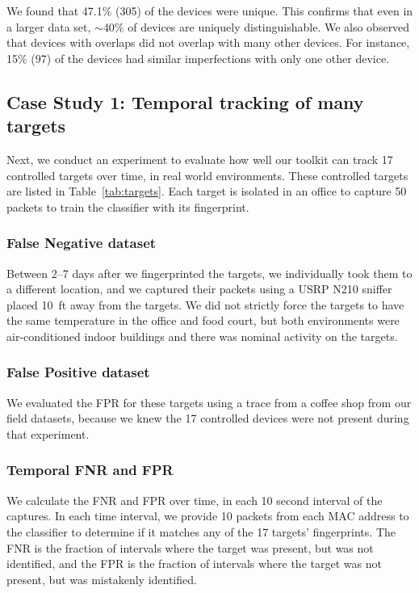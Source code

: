 We found that 47.1\% (305) of the
devices were unique. This confirms that even
in a larger data set, $\sim$40\% of devices are uniquely distinguishable. We also observed that devices with overlaps did not
overlap with many other devices. For instance, 15\% (97) of the
devices had similar imperfections with only one other device. 

\iffalse
\subsection{Case Study 1: Temporal tracking of many targets}
\label{sec:results:case1}

Next, we conduct an experiment to evaluate how well our toolkit can track 17
controlled targets over time, in real world environments. 
These controlled targets are listed in Table~\ref{tab:targets}. Each target is isolated in an office to capture 50 packets to train the classifier with its fingerprint.
 
\subsubsection*{False Negative dataset} Between 2--7 days after we
fingerprinted the targets, we individually took them to a different location,
and we captured their packets using a USRP N210 sniffer placed
10~ft away from the targets. We did not strictly force the targets to have the
same temperature in the office and food court, but both environments were
air-conditioned indoor buildings and there was nominal activity on the targets.

\subsubsection*{False Positive dataset} We evaluated the FPR for these targets
using a trace from a coffee shop from our field datasets, because we knew the
17 controlled devices were not present during that experiment.

\subsubsection*{Temporal FNR and FPR} We calculate the FNR and FPR over time,
in each 10 second interval of the captures. In each time interval, we provide 10
packets from each MAC address to the classifier to determine if it matches any
of the 17 targets' fingerprints. The FNR is the fraction of intervals where the
target was present, but was not identified, and the FPR is the fraction of
intervals where the target was not present, but was mistakenly identified.

